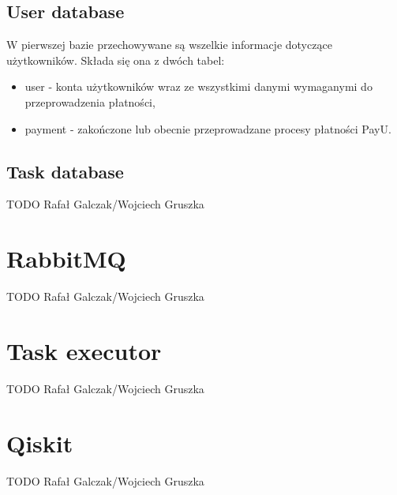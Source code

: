 \subsection{User database}
W pierwszej bazie przechowywane są wszelkie informacje dotyczące użytkowników. Składa się ona z dwóch tabel:
\begin{itemize}
    \item user - konta użytkowników wraz ze wszystkimi danymi wymaganymi do przeprowadzenia płatności,
    \item payment - zakończone lub obecnie przeprowadzane procesy płatności PayU.
\end{itemize}
\subsection{Task database}
TODO Rafał Galczak/Wojciech Gruszka
\section{RabbitMQ}
TODO Rafał Galczak/Wojciech Gruszka
\section{Task executor}
TODO Rafał Galczak/Wojciech Gruszka
\section{Qiskit}
TODO Rafał Galczak/Wojciech Gruszka
